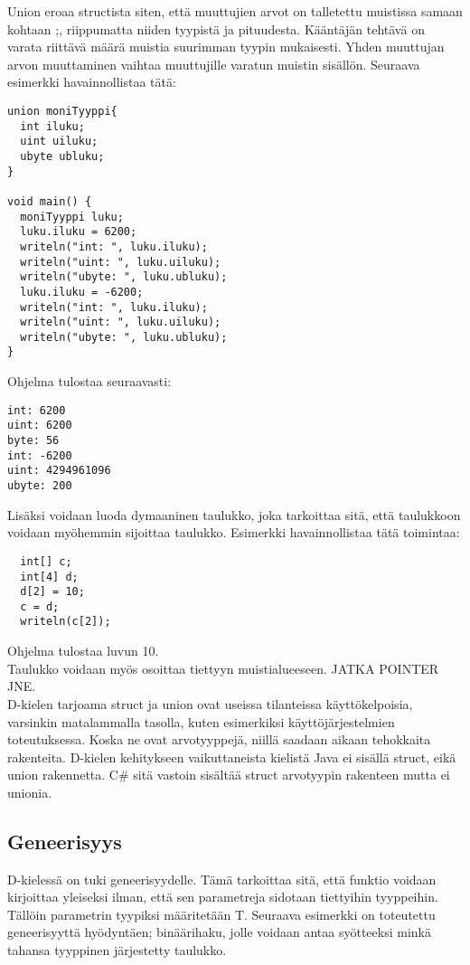 \documentclass[11pt,oneside,a4paper]{article}
\begin{document}
Union eroaa structista siten, että muuttujien arvot on talletettu muistissa samaan kohtaan \cite{ALE10};\cite{KRR88}, riippumatta niiden tyypistä ja pituudesta. Kääntäjän tehtävä on varata riittävä määrä muistia suurimman tyypin mukaisesti. Yhden muuttujan arvon muuttaminen vaihtaa muuttujille varatun muistin sisällön. Seuraava esimerkki havainnollistaa tätä:
\begin{verbatim}
union moniTyyppi{
  int iluku;
  uint uiluku;
  ubyte ubluku;
}

void main() {
  moniTyyppi luku;
  luku.iluku = 6200;
  writeln("int: ", luku.iluku);
  writeln("uint: ", luku.uiluku);
  writeln("ubyte: ", luku.ubluku);
  luku.iluku = -6200;
  writeln("int: ", luku.iluku);
  writeln("uint: ", luku.uiluku);
  writeln("ubyte: ", luku.ubluku);
}
\end{verbatim}
Ohjelma tulostaa seuraavasti:

\begin{verbatim}
int: 6200
uint: 6200
byte: 56
int: -6200
uint: 4294961096
ubyte: 200
\end{verbatim}

Lisäksi voidaan luoda dymaaninen taulukko, joka tarkoittaa sitä, että taulukkoon voidaan myöhemmin sijoittaa taulukko. Esimerkki havainnollistaa tätä toimintaa:

\begin{verbatim}
  int[] c;
  int[4] d;
  d[2] = 10;
  c = d;
  writeln(c[2]);
\end{verbatim}
Ohjelma tulostaa luvun 10. \\
Taulukko voidaan myös osoittaa tiettyyn muistialueeseen. JATKA POINTER JNE. \\


D-kielen tarjoama struct ja union ovat useissa tilanteissa käyttökelpoisia, varsinkin matalammalla tasolla, kuten esimerkiksi käyttöjärjestelmien toteutuksessa. Koska ne ovat arvotyyppejä, niillä saadaan aikaan tehokkaita rakenteita. D-kielen kehitykseen vaikuttaneista kielistä Java ei sisällä struct, eikä union rakennetta. C\# sitä vastoin sisältää struct arvotyypin rakenteen mutta ei unionia.

\subsection{Geneerisyys}
D-kielessä on tuki geneerisyydelle. Tämä tarkoittaa sitä, että funktio voidaan kirjoittaa yleiseksi ilman, että sen parametreja sidotaan tiettyihin tyyppeihin. Tällöin parametrin tyypiksi määritetään T. Seuraava esimerkki on toteutettu geneerisyyttä hyödyntäen; binäärihaku, jolle voidaan antaa syötteeksi minkä tahansa tyyppinen järjestetty taulukko.
\end{document}
